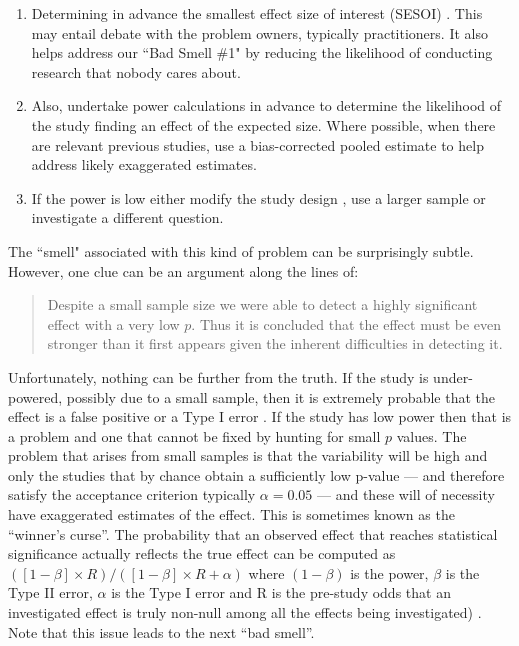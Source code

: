 \documentclass[10pt]{elsarticle}
\newcommand{\RRED}{\color{red}}
\newcommand{\BLACK}{\color{black}}
\begin{document}
\begin{enumerate}
\item Determining in advance the smallest effect size of interest (SESOI) \cite{Lake17}.  This may entail debate with the problem owners, typically practitioners.  It also helps address our ``Bad Smell \#1" by reducing the likelihood of conducting research that nobody cares about.
\item Also, undertake power calculations in advance to determine the likelihood of the study finding an effect of the expected size.  Where possible, when there are relevant previous studies, use a bias-corrected pooled estimate \cite{Schm14} to help address likely exaggerated estimates.
\item If the power is low either modify the study design \cite{McCl00}, use a larger sample or investigate a different question.
\end{enumerate}

\noindent
The ``smell" associated with this kind of problem can be surprisingly subtle.  However, one clue can be an argument along the lines of:
\begin{quote}
    Despite a small sample size we were able to detect a highly significant effect with a very low $p$. Thus it is concluded that the effect must be even stronger than it first appears given the inherent difficulties in detecting it.
\end{quote}

\noindent
Unfortunately, nothing can be further from the truth.  If the study is under-powered, possibly due to a small sample, then it is extremely probable that the effect is a false positive or a Type I error \cite{Loke17}.  If the study has low power then that is a problem and one that cannot be fixed by hunting for small $p$ values.
\RRED The problem that arises from small samples is that the variability will be high and only the studies that by chance obtain a sufficiently low p-value --- and therefore satisfy the acceptance criterion typically $\alpha=0.05$ --- and these will of necessity have exaggerated estimates of the effect. This is sometimes known as the ``winner's curse''.  The probability that an observed effect that reaches statistical significance actually reflects the true effect can be computed 
as $([1 - \beta] \times R) / ([1- \beta] \times R + \alpha)$ 
where $(1-\beta)$ is the power, $\beta$ is the Type II error, $\alpha$ is the Type I error and R is the pre-study odds that an investigated effect is truly non-null among all the effects being investigated) \cite{Loke17,Szuc17}. \BLACK
Note that this issue  leads to the next ``bad smell''.
\end{document}
